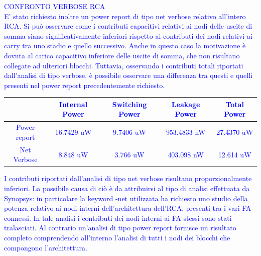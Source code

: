 \documentclass[11pt,  english, makeidx, a4paper, titlepage, oneside]{book}
\begin{document}
\newpage
\textcolor{blue}{CONFRONTO VERBOSE RCA
\\
E' stato richiesto inoltre un power report di tipo net verbose relativo all'intero RCA. Si può osservare come i contributi capacitivi relativi
ai nodi delle uscite di somma siano significativamente inferiori rispetto ai contributi dei nodi relativi ai carry tra uno stadio e quello successivo.
Anche in questo caso la motivazione è dovuta al carico capacitivo inferiore delle uscite di somma, che non risultano collegate ad ulteriori
blocchi. Tuttavia, osservando i contributi totali riportati dall'analisi di tipo verbose, è possibile osservare una differenza tra questi e 
quelli presenti nel power report precedentemente richiesto. 
\\
\begin{center}
	\begin{tabular}{|c|c|c|c|c|}
	\hline
	& Internal Power & Switching Power & Leakage Power & Total Power \\ 
	\hline
	Power report & 16.7429 uW & 9.7406 uW & 953.4833 nW & 27.4370 uW \\
	\hline
	Net Verbose & 8.848 uW & 3.766 uW & 403.098 nW & 12.614 uW \\
	\hline
	\end{tabular}
\end{center}
\vspace{0.3cm}
I contributi riportati dall'analisi di tipo net verbose risultano proporzionalmente inferiori. La possibile causa di ciò è da attribuirsi al tipo
di analisi effettuata da Synopsys: in particolare la keyword -net utilizzata ha richiesto uno studio della potenza relativo ai nodi interni
dell'architettura dell'RCA, presenti tra i vari FA connessi. In tale analisi i contributi dei nodi interni ai FA stessi sono stati
tralasciati. Al contrario un'analisi di tipo power report fornisce un risultato completo comprendendo all'interno l'analisi di tutti i nodi dei
blocchi che compongono l'architettura.
}
\newpage
\end{document}
